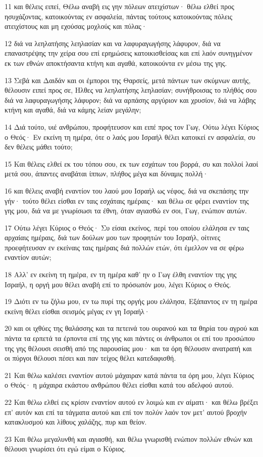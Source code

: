 \par 11 και θέλεις ειπεί, Θέλω αναβή εις γην πόλεων ατειχίστων· θέλω ελθεί προς ησυχάζοντας, κατοικούντας εν ασφαλεία, πάντας τούτους κατοικούντας πόλεις ατειχίστους και μη εχούσας μοχλούς και πύλας·
\par 12 διά να λεηλατήσης λεηλασίαν και να λαφυραγωγήσης λάφυρον, διά να επαναστρέψης την χείρα σου επί ερημώσεις κατοικισθείσας και επί λαόν συνηγμένον εκ των εθνών αποκτήσαντα κτήνη και αγαθά, κατοικούντα εν μέσω της γης.
\par 13 Σεβά και Δαιδάν και οι έμποροι της Θαρσείς, μετά πάντων των σκύμνων αυτής, θέλουσιν ειπεί προς σε, Ηλθες να λεηλατήσης λεηλασίαν; συνήθροισας το πλήθός σου διά να λαφυραγωγήσης λάφυρον; διά να αρπάσης αργύριον και χρυσίον, διά να λάβης κτήνη και αγαθά, διά να κάμης λείαν μεγάλην;
\par 14 Διά τούτο, υιέ ανθρώπου, προφήτευσον και ειπέ προς τον Γωγ, Ούτω λέγει Κύριος ο Θεός· Εν εκείνη τη ημέρα, ότε ο λαός μου Ισραήλ θέλει κατοικεί εν ασφαλεία, συ δεν θέλεις μάθει τούτο;
\par 15 Και θέλεις ελθεί εκ του τόπου σου, εκ των εσχάτων του βορρά, συ και πολλοί λαοί μετά σου, άπαντες αναβάται ίππων, πλήθος μέγα και δύναμις πολλή·
\par 16 και θέλεις αναβή εναντίον του λαού μου Ισραήλ ως νέφος, διά να σκεπάσης την γήν· τούτο θέλει είσθαι εν ταις εσχάταις ημέραις· και θέλω σε φέρει εναντίον της γης μου, διά να με γνωρίσωσι τα έθνη, όταν αγιασθώ εν σοι, Γωγ, ενώπιον αυτών.
\par 17 Ούτω λέγει Κύριος ο Θεός· Συ είσαι εκείνος, περί του οποίου ελάλησα εν ταις αρχαίαις ημέραις, διά των δούλων μου των προφητών του Ισραήλ, οίτινες προεφήτευσαν εν εκείναις ταις ημέραις διά πολλών ετών, ότι έμελλον να σε φέρω εναντίον αυτών;
\par 18 Αλλ' εν εκείνη τη ημέρα, εν τη ημέρα καθ' ην ο Γωγ έλθη εναντίον της γης Ισραήλ, η οργή μου θέλει αναβή επί το πρόσωπόν μου, λέγει Κύριος ο Θεός.
\par 19 Διότι εν τω ζήλω μου, εν τω πυρί της οργής μου ελάλησα, Εξάπαντος εν τη ημέρα εκείνη θέλει είσθαι σεισμός μέγας εν γη Ισραήλ·
\par 20 και οι ιχθύες της θαλάσσης και τα πετεινά του ουρανού και τα θηρία του αγρού και πάντα τα ερπετά τα έρποντα επί της γης και πάντες οι άνθρωποι οι επί του προσώπου της γης θέλουσι σεισθή από της παρουσίας μου· και τα όρη θέλουσιν ανατραπή και οι πύργοι θέλουσι πέσει και παν τείχος θέλει κατεδαφισθή.
\par 21 Και θέλω καλέσει εναντίον αυτού μάχαιραν κατά πάντα τα όρη μου, λέγει Κύριος ο Θεός· η μάχαιρα εκάστου ανθρώπου θέλει είσθαι κατά του αδελφού αυτού.
\par 22 Και θέλω ελθεί εις κρίσιν εναντίον αυτού εν λοιμώ και εν αίματι· και θέλω βρέξει επ' αυτόν και επί τα τάγματα αυτού και επί τον πολύν λαόν τον μετ' αυτού βροχήν κατακλυσμού και λίθους χαλάζης, πυρ και θείον.
\par 23 Και θέλω μεγαλυνθή και αγιασθή, και θέλω γνωρισθή ενώπιον πολλών εθνών και θέλουσι γνωρίσει ότι εγώ είμαι ο Κύριος.

